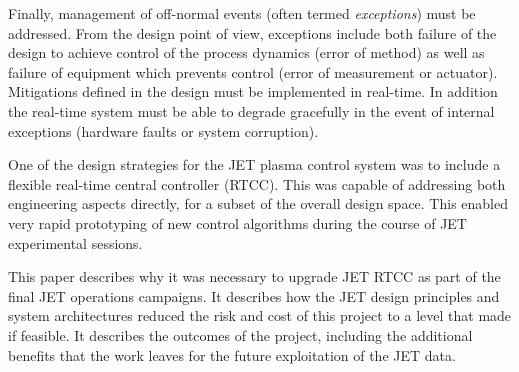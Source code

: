 \documentclass[5p]{elsarticle}
\begin{document}
Finally, management of off-normal events (often termed {\em exceptions}) 
must be addressed.  From the design point of view, exceptions include both
failure of the design to achieve control of the process dynamics (error of method)
as well as failure of equipment which prevents control (error of measurement or actuator).
Mitigations defined in the design must be implemented in real-time.  In addition
the real-time system must be able to degrade gracefully in the event of internal
exceptions (hardware faults or system corruption).

One of the design strategies for the JET plasma control system was to include
a flexible real-time central controller (RTCC). This was capable of 
addressing both engineering aspects directly, for a subset of the overall
design space.  This enabled very rapid prototyping of new control
algorithms during the course of JET experimental sessions.

This paper describes why it was necessary to upgrade JET RTCC as part of the
final JET operations campaigns.  It describes how the JET design principles
and system architectures reduced the risk and cost of this project to a 
level that made if feasible.  It describes the outcomes of the project, 
including the additional benefits that the work leaves for the future
exploitation of the JET data.



%
%


\end{document}
